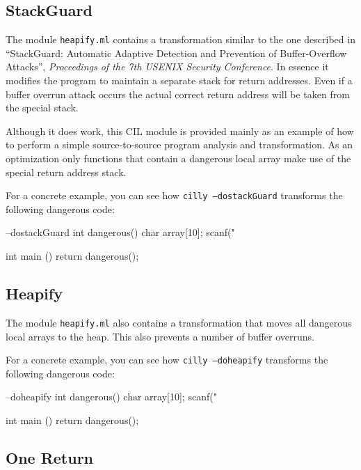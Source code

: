 \documentclass{article}
\def\t#1{{\tt #1}}
\begin{document}
\subsection{StackGuard}

The module \t{heapify.ml} contains a transformation similar to the one
described in ``StackGuard: Automatic Adaptive Detection and Prevention of
Buffer-Overflow Attacks'', {\em Proceedings of the 7th USENIX Security
Conference}. In essence it modifies the program to maintain a separate
stack for return addresses. Even if a buffer overrun attack occurs the
actual correct return address will be taken from the special stack. 

Although it does work, this CIL module is provided mainly as an example of
how to perform a simple source-to-source program analysis and
transformation. As an optimization only functions that contain a dangerous
local array make use of the special return address stack. 

For a concrete example, you can see how \t{cilly --dostackGuard}
transforms the following dangerous code: 

\begin{cilcode}[global] --dostackGuard
  int dangerous() {
    char array[10];
    scanf("%
  }

  int main () {
    return dangerous();
  }
\end{cilcode}


\subsection{Heapify}
 
The module \t{heapify.ml} also contains a transformation that moves all
dangerous local arrays to the heap. This also prevents a number of buffer
overruns. 

For a concrete example, you can see how \t{cilly --doheapify}
transforms the following dangerous code: 

\begin{cilcode}[global] --doheapify
  int dangerous() {
    char array[10];
    scanf("%
  }

  int main () {
    return dangerous();
  }
\end{cilcode}

\subsection{One Return}
\end{document}
